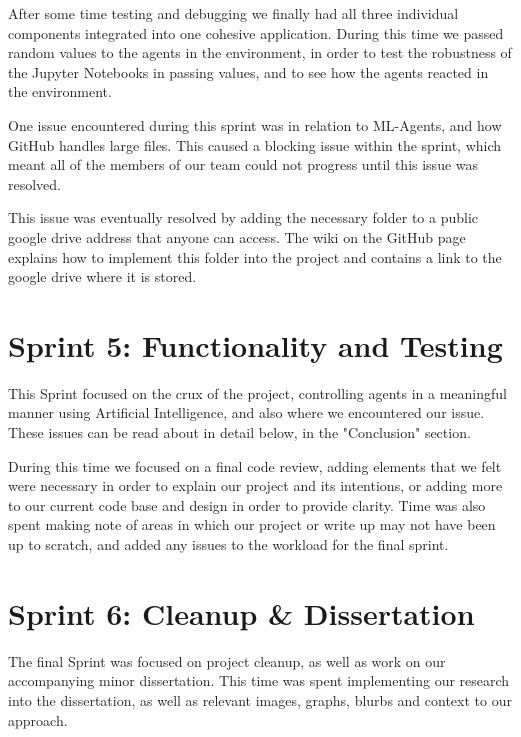 	After some time testing and debugging we finally had all three individual components integrated into one cohesive application. During this time we passed random values to the agents in the environment, in order to test the robustness of the Jupyter Notebooks in passing values, and to see how the agents reacted in the environment.
	
	One issue encountered during this sprint was in relation to ML-Agents, and how GitHub handles large files. This caused a blocking issue within the sprint, which meant all of the members of our team could not progress until this issue was resolved. 
	
	This issue was eventually resolved by adding the necessary folder to a public google drive address that anyone can access. The wiki on the GitHub page explains how to implement this folder into the project and contains a link to the google drive where it is stored.


\section{Sprint 5: Functionality and Testing}
	
	This Sprint focused on the crux of the project, controlling agents in a meaningful manner using Artificial Intelligence, and also where we encountered our issue. These issues can be read about in detail below, in the "Conclusion" section. 
	
	During this time we focused on a final code review, adding elements that we felt were necessary in order to explain our project and its intentions, or adding more to our current code base and design in order to provide clarity.
	Time was also spent making note of areas in which our project or write up may not have been up to scratch, and added any issues to the workload for the final sprint.


\section{Sprint 6: Cleanup \& Dissertation} 

	The final Sprint was focused on project cleanup, as well as work on our accompanying minor dissertation. This time was spent implementing our research into the dissertation, as well as relevant images, graphs, blurbs and context to our approach.  
